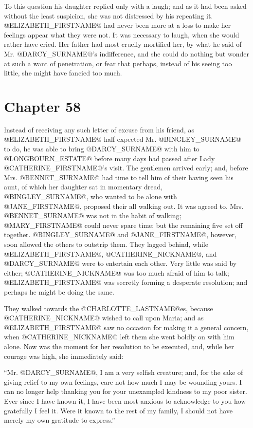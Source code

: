 To this question his daughter replied only with a laugh; and as it had
been asked without the least suspicion, she was not distressed by
his repeating it. @ELIZABETH_FIRSTNAME@ had never been more at a loss to make her
feelings appear what they were not. It was necessary to laugh, when she
would rather have cried. Her father had most cruelly mortified her, by
what he said of Mr. @DARCY_SURNAME@'s indifference, and she could do nothing but
wonder at such a want of penetration, or fear that perhaps, instead of
his seeing too little, she might have fancied too much.



\chapter*{Chapter 58}


Instead of receiving any such letter of excuse from his friend, as
@ELIZABETH_FIRSTNAME@ half expected Mr. @BINGLEY_SURNAME@ to do, he was able to bring @DARCY_SURNAME@
with him to @LONGBOURN_ESTATE@ before many days had passed after Lady @CATHERINE_FIRSTNAME@'s
visit. The gentlemen arrived early; and, before Mrs. @BENNET_SURNAME@ had time
to tell him of their having seen his aunt, of which her daughter sat
in momentary dread, @BINGLEY_SURNAME@, who wanted to be alone with @JANE_FIRSTNAME@, proposed
their all walking out. It was agreed to. Mrs. @BENNET_SURNAME@ was not in the
habit of walking; @MARY_FIRSTNAME@ could never spare time; but the remaining five
set off together. @BINGLEY_SURNAME@ and @JANE_FIRSTNAME@, however, soon allowed the others
to outstrip them. They lagged behind, while @ELIZABETH_FIRSTNAME@, @CATHERINE_NICKNAME@, and @DARCY_SURNAME@
were to entertain each other. Very little was said by either; @CATHERINE_NICKNAME@
was too much afraid of him to talk; @ELIZABETH_FIRSTNAME@ was secretly forming a
desperate resolution; and perhaps he might be doing the same.

They walked towards the @CHARLOTTE_LASTNAME@es, because @CATHERINE_NICKNAME@ wished to call upon
Maria; and as @ELIZABETH_FIRSTNAME@ saw no occasion for making it a general concern,
when @CATHERINE_NICKNAME@ left them she went boldly on with him alone. Now was the
moment for her resolution to be executed, and, while her courage was
high, she immediately said:

``Mr. @DARCY_SURNAME@, I am a very selfish creature; and, for the sake of giving
relief to my own feelings, care not how much I may be wounding yours. I
can no longer help thanking you for your unexampled kindness to my
poor sister. Ever since I have known it, I have been most anxious to
acknowledge to you how gratefully I feel it. Were it known to the rest
of my family, I should not have merely my own gratitude to express.''

